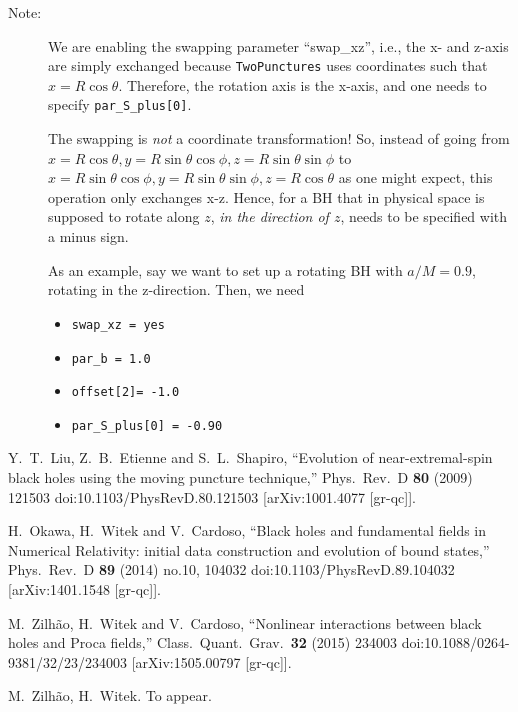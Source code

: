 \begin{description}

\item[Note:] We are enabling the swapping parameter ``swap\_xz'', i.e., the x- and
  z-axis are simply exchanged because \texttt{TwoPunctures} uses coordinates such that
  $x=R\cos\theta$.  Therefore, the rotation axis is the x-axis, and one needs to
  specify \texttt{par\_S\_plus[0]}.

  The swapping is \emph{not} a coordinate transformation!  So, instead of
  going from $x=R\cos\theta, y=R\sin\theta\cos\phi, z=R\sin\theta\sin\phi$ to
  $x=R\sin\theta\cos\phi, y=R\sin\theta\sin\phi, z=R\cos\theta$ as one might
  expect, this operation only exchanges x-z.  Hence, for a BH that in physical
  space is supposed to rotate along $z$, \emph{in the direction of $z$}, needs
  to be specified with a minus sign.

  As an example, say we want to set up a rotating BH with $a/M = 0.9$, rotating
  in the z-direction. Then, we need
    \begin{itemize}
    \item \texttt{swap\_xz = yes}
    \item \texttt{par\_b = 1.0}
    \item \texttt{offset[2]= -1.0}
    \item \texttt{par\_S\_plus[0] = -0.90}
    \end{itemize}

\end{description}






\begin{thebibliography}{9}

  Y.~T.~Liu, Z.~B.~Etienne and S.~L.~Shapiro,
  ``Evolution of near-extremal-spin black holes using the moving puncture technique,''
  Phys.\ Rev.\ D {\bf 80} (2009) 121503
  doi:10.1103/PhysRevD.80.121503
  [arXiv:1001.4077 [gr-qc]].

  H.~Okawa, H.~Witek and V.~Cardoso,
  ``Black holes and fundamental fields in Numerical Relativity: initial data construction and evolution of bound states,''
  Phys.\ Rev.\ D {\bf 89} (2014) no.10,  104032
  doi:10.1103/PhysRevD.89.104032
  [arXiv:1401.1548 [gr-qc]].

  M.~Zilh\~ao, H.~Witek and V.~Cardoso,
  ``Nonlinear interactions between black holes and Proca fields,''
  Class.\ Quant.\ Grav.\  {\bf 32} (2015) 234003
  doi:10.1088/0264-9381/32/23/234003
  [arXiv:1505.00797 [gr-qc]].

  M.~Zilh\~ao, H.~Witek. To appear.


\end{thebibliography}

